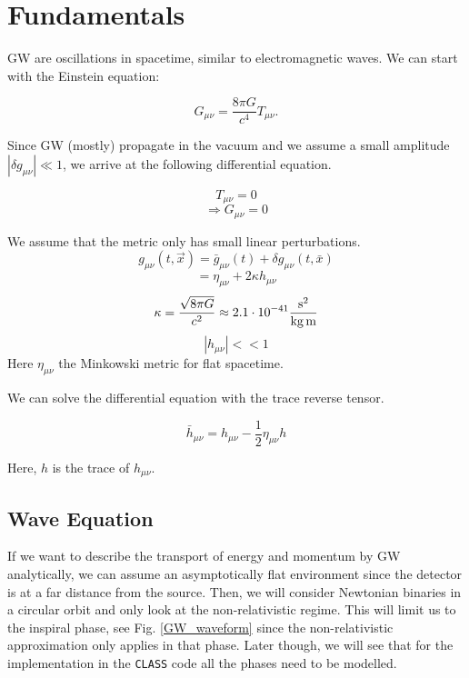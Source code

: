 \section{Fundamentals}
GW are oscillations in spacetime, similar to electromagnetic
waves. We can start with the Einstein equation:

\begin{equation}
    G_{\mu\nu}= \frac{8\pi G}{c^4} T_{\mu\nu}.
\end{equation}

Since GW (mostly) propagate in the vacuum and we assume a small amplitude $|\delta g_{\mu\nu}| \ll 1$, we arrive at the following differential equation.

\begin{equation}
    T_{\mu\nu} = 0
\end{equation}
\begin{equation}
    \Rightarrow G_{\mu\nu} = 0
\end{equation}


We assume that the metric only has small linear perturbations. 
\begin{equation}
    g_{\mu \nu}(t, \vec{x}) = \bar{g}_{\mu \nu}(t) + \delta g_{\mu \nu}(t, \bar{x})
\end{equation}
\begin{equation}
   = \eta_{\mu \nu} + 2\kappa h_{\mu \nu}
\end{equation}
\begin{equation}
    \kappa = \frac{\sqrt{8\pi G}}{c^2} \approx 2.1 \cdot 10^{-41}\frac{\rm{s}^2}{\rm{kg}\,\rm{ m}}
\end{equation}
\begin{equation}
    |h_{\mu \nu}| << 1
\end{equation}
Here $\eta_{ \mu \nu}$ the Minkowski metric for flat spacetime.

We can solve the differential equation with the trace reverse tensor.

\begin{equation}
    \bar{h}_{\mu\nu} = h_{\mu\nu}-\frac{1}{2} \eta_{\mu\nu}h
    \label{trace_reverse}
\end{equation}

Here, $h$ is the trace of $h_{\mu\nu}$.

\subsection{Wave Equation}

If we want to describe the transport of energy and momentum by GW analytically, we can assume an asymptotically flat environment since the detector is at a far distance from the source. Then, we will consider Newtonian binaries in a circular orbit and only look at the non-relativistic regime. This will limit us to the inspiral phase, see Fig. \ref{GW_waveform} since the non-relativistic approximation only applies in that phase. Later though, we will see that for the implementation in the {\tt CLASS} code all the phases need to be modelled.

